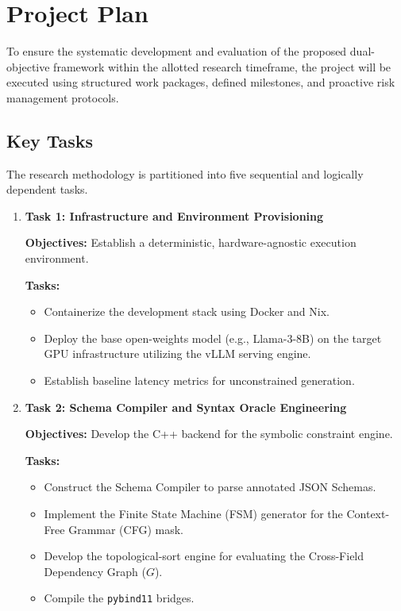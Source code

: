 \section{Project Plan}

To ensure the systematic development and evaluation of the proposed dual-objective 
framework within the allotted research timeframe, the project will be executed using 
structured work packages, defined milestones, and proactive risk management protocols.

\subsection{Key Tasks}
The research methodology is partitioned into five sequential and logically dependent 
tasks.

\begin{enumerate}

\item \textbf{Task 1: Infrastructure and Environment Provisioning}

\textbf{Objectives:} Establish a deterministic, hardware-agnostic execution environment.

\textbf{Tasks:}
\begin{itemize}
\item Containerize the development stack using Docker and Nix.
\item Deploy the base open-weights model (e.g., Llama-3-8B) on the target GPU 
infrastructure utilizing the vLLM serving engine.
\item Establish baseline latency metrics for unconstrained generation.
\end{itemize}

\item \textbf{Task 2: Schema Compiler and Syntax Oracle Engineering}

\textbf{Objectives:} Develop the C++ backend for the symbolic constraint engine.

\textbf{Tasks:}
\begin{itemize}
\item Construct the Schema Compiler to parse annotated JSON Schemas.
\item Implement the Finite State Machine (FSM) generator for the Context-Free 
Grammar (CFG) mask.
\item Develop the topological-sort engine for evaluating the Cross-Field 
Dependency Graph ($G$).
\item Compile the \texttt{pybind11} bridges.
\end{itemize}


\end{enumerate}
